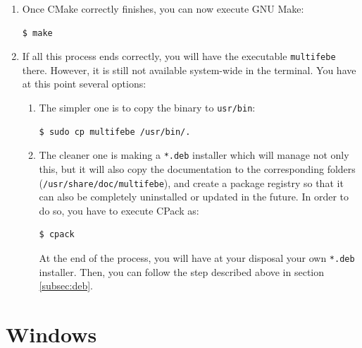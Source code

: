 \documentclass[a4paper,fleqn]{book}
\begin{document}
\begin{enumerate}
\begin{Verbatim}[frame=single, fontsize=\small]
$ cmake -D CMAKE_BUILD_TYPE=Release -G "Unix Makefiles" ..
\end{Verbatim}
If you want to compile for debugging, you should use the Debug build:
\begin{Verbatim}[frame=single, fontsize=\small]
$ cmake -D CMAKE_BUILD_TYPE=Debug -G "Unix Makefiles" ..
\end{Verbatim}
During the process, if any tool or dependency is missing, then CMake is going to notify you.
    \item Once CMake correctly finishes, you can now execute GNU Make:
\begin{Verbatim}[frame=single, fontsize=\small]
$ make
\end{Verbatim}
    \item If all this process ends correctly, you will have the executable \texttt{multifebe} there. However, it is still not available system-wide in the terminal. You have at this point several options:
    \begin{enumerate}
    \item The simpler one is to copy the binary to \texttt{usr/bin}:
\begin{Verbatim}[frame=single, fontsize=\small]
$ sudo cp multifebe /usr/bin/.
\end{Verbatim}
    \item The cleaner one is making a \texttt{*.deb} installer which will manage not only this, but it will also copy the documentation to the corresponding folders (\texttt{/usr/share/doc/multifebe}), and create a package registry so that it can also be completely uninstalled or updated in the future. In order to do so, you have to execute CPack as:
\begin{Verbatim}[frame=single, fontsize=\small]
$ cpack
\end{Verbatim}
    At the end of the process, you will have at your disposal your own \texttt{*.deb} installer. Then, you can follow the step described above in section \ref{subsec:deb}.
    \end{enumerate}
\end{enumerate}

\section{Windows}
\end{document}
